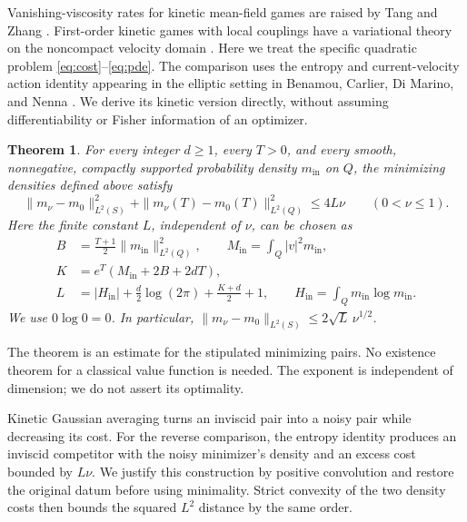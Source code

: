 \documentclass[11pt]{article}
\newtheorem{theorem}{Theorem}
\newcommand{\mi}{m_{\mathrm{in}}}
\begin{document}
Vanishing-viscosity rates for kinetic mean-field games are raised by
Tang and Zhang \cite[Section~7, item~4(b)]{TZ}. First-order kinetic games
with local couplings have a variational theory on the noncompact velocity
domain \cite[Abstract]{GPM}. Here we treat the specific quadratic problem
\eqref{eq:cost}--\eqref{eq:pde}. The comparison uses the entropy and
current-velocity action identity appearing in the elliptic setting in
Benamou, Carlier, Di Marino, and Nenna \cite[eqs.~(2.9)--(2.10)]{BCDN}.
We derive its kinetic version directly, without assuming differentiability
or Fisher information of an optimizer.

\begin{theorem}\label{thm:main}
For every integer $d\geq1$, every $T>0$, and every smooth, nonnegative,
compactly supported probability density $\mi$ on $Q$, the minimizing
densities defined above satisfy
\begin{equation}\label{eq:main}
 \|m_\nu-m_0\|_{L^2(S)}^2+
 \|m_\nu(T)-m_0(T)\|_{L^2(Q)}^2\leq4L\nu
 \qquad(0<\nu\leq1).
\end{equation}
Here the finite constant $L$, independent of $\nu$, can be chosen as
\begin{equation}\label{eq:constants}
 \begin{split}
 B&=\frac{T+1}{2}\|\mi\|_{L^2(Q)}^2,\qquad
 M_{\mathrm{in}}=\int_Q|v|^2\mi,\\
 K&=e^T(M_{\mathrm{in}}+2B+2dT),\\
 L&=|H_{\mathrm{in}}|+\frac d2\log(2\pi)+\frac{K+d}{2}+1,
 \qquad H_{\mathrm{in}}=\int_Q\mi\log\mi .
 \end{split}
\end{equation}
We use $0\log0=0$. In particular,
$\|m_\nu-m_0\|_{L^2(S)}\leq2\sqrt L\,\nu^{1/2}$.
\end{theorem}

The theorem is an estimate for the stipulated minimizing pairs.
No existence theorem for a classical value function is needed.
The exponent is independent of dimension; we do not assert its optimality.

Kinetic Gaussian averaging turns an inviscid pair into a noisy pair while
decreasing its cost. For the reverse comparison, the entropy identity
produces an inviscid competitor with the noisy minimizer's density and an
excess cost bounded by $L\nu$. We justify this construction by positive
convolution and restore the original datum before using minimality.
Strict convexity of the two density costs then bounds the squared $L^2$
distance by the same order.
\end{document}
